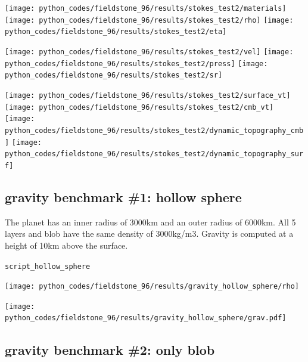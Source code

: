 \begin{center}
\texttt{[image: python\_codes/fieldstone\_96/results/stokes\_test2/materials]}
\texttt{[image: python\_codes/fieldstone\_96/results/stokes\_test2/rho]}
\texttt{[image: python\_codes/fieldstone\_96/results/stokes\_test2/eta]}
\end{center}


\begin{center}
\texttt{[image: python\_codes/fieldstone\_96/results/stokes\_test2/vel]}
\texttt{[image: python\_codes/fieldstone\_96/results/stokes\_test2/press]}
\texttt{[image: python\_codes/fieldstone\_96/results/stokes\_test2/sr]}
\end{center}



\begin{center}
\texttt{[image: python\_codes/fieldstone\_96/results/stokes\_test2/surface\_vt]}
\texttt{[image: python\_codes/fieldstone\_96/results/stokes\_test2/cmb\_vt]}\\
\texttt{[image: python\_codes/fieldstone\_96/results/stokes\_test2/dynamic\_topography\_cmb]}
\texttt{[image: python\_codes/fieldstone\_96/results/stokes\_test2/dynamic\_topography\_surf]}\\
\end{center}





\newpage
\subsection*{gravity benchmark \#1: hollow sphere}

The planet has an inner radius of 3000km and an outer radius of 6000km.
All 5 layers and blob have the same density of 3000kg/m3.
Gravity is computed at a height of 10km above the surface.

{\tt script\_hollow\_sphere}

\begin{center}
\texttt{[image: python\_codes/fieldstone\_96/results/gravity\_hollow\_sphere/rho]}
\end{center}

\begin{center}
\texttt{[image: python\_codes/fieldstone\_96/results/gravity\_hollow\_sphere/grav.pdf]}
\end{center}

\newpage
\subsection*{gravity benchmark \#2: only blob}

